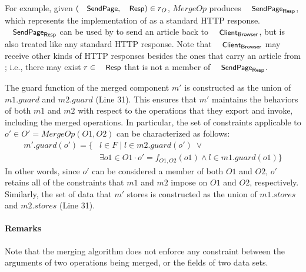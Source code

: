 For example, given $(\txtcname{SendPage}, \txtcname{Resp}) \in r_{O}$,
$MergeOp$ produces $\txtcname{SendPage}_{\textsf{Resp}}$, which
represents the implementation of  as a standard HTTP
response.  $\txtcname{SendPage}_{\textsf{Resp}}$ can be used by
 to send an article back to
$\txtcname{Client}_\textsf{Browser}$, but is also treated like any
standard HTTP response. Note that $\txtcname{Client}_\textsf{Browser}$
may receive other kinds of HTTP responses besides the ones that carry
an article from ; i.e., there may exist $r \in
\txtcname{Resp}$ that is not a member of $\txtcname{SendPage}_{\textsf{Resp}}$.

The guard function of the merged component $m'$ is constructed
as the union of $m1.guard$ and $m2.guard$ (Line 31). This ensures that $m'$
maintains the behaviors of both $m1$ and $m2$ with respect to the
operations that they export and invoke, including the merged
operations. In particular, the set of constraints applicable to $o' \in O' =
MergeOp(O1, O2)$ can be characterized as follows:
\begin{align*}
m'.guard(o') = \{& l \in F \;|\; l \in m2.guard(o') \; \lor \\
&\exists o1 \in O1 
\cdot o' = f_{O1, O2}(o1) \land l \in m1.guard(o1) \} 
\end{align*}
In other words, since $o'$ can be considered a member of both $O1$ and
$O2$, $o'$ retains all of the constraints that $m1$ and $m2$ impose
on $O1$ and $O2$, respectively. Similarly, the set of data that $m'$
stores is constructed as the union of $m1.stores$ and $m2.stores$ (Line 31).



\paragraph{\textbf{Remarks}} Note that the merging algorithm
does not enforce any constraint between the arguments of two
operations being merged, or the fields of two data sets. 

